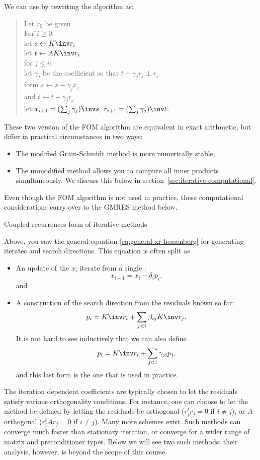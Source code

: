 We can
use  by rewriting the algorithm
as:
\begin{quote}
  \begin{tabbing}
    Let $r_0$ be given\\
    For \=$i\geq 0$:\\
    \>let $s\leftarrow K\inv r_i$\\
    \>let $t\leftarrow AK\inv r_i$\\
    \>for \=$j\leq i$:\\
    \>\>let $\gamma_j$ be the coefficient so that $t-\gamma_jr_j\perp r_j$\\
    \>\>form \=$s\leftarrow s-\gamma_jx_j$\\
    \>\>and  \>$t\leftarrow t-\gamma_jr_j$\\
    \>let $x_{i+1}=(\sum_j\gamma_j)\inv s$,
    $r_{i+1}=(\sum_j\gamma_j)\inv t$.\\
  \end{tabbing}
\end{quote}
These two version of the \ac{FOM} algorithm are 
equivalent in exact arithmetic, but differ in practical circumstances
in two ways:
\begin{itemize}
\item The modified Gram-Schmidt method is more numerically stable;
\item The unmodified method allows you to compute all inner products
  simultaneously. We discuss this below in
  section~\ref{sec:iterative-computational}.
\end{itemize}
Even though the \ac{FOM} algorithm is not used in practice, these
computational considerations carry over to the \ac{GMRES} method
below.

 {Coupled recurrences form of iterative methods}

Above, you saw the general equation \eqref{eq:general-xr-hessenberg}
for generating iterates and search directions.
This equation is often split as
\begin{itemize}
\item An update of the $x_i$ iterate from a single :
\[ x_{i+1}=x_i-\delta_i p_i, \] and
\item A construction of the search direction from the residuals known
  so far:
  \[ p_i = K\inv r_i+\sum_{j<i}\beta_{ij} K\inv r_j. \]
  It is not hard to see inductively that we can also define
  \[ p_i = K\inv r_i+\sum_{j<i}\gamma_{ji} p_j, \]
  and this last form is the one that is used in practice.
\end{itemize}
The iteration dependent coefficients are typically chosen to let the
residuals satisfy various orthogonality conditions. For instance, one
can choose to let the method be defined by letting the residuals be
orthogonal ($r_i^tr_j=0$ if $i\not=j$), or $A$-orthogonal
($r_i^tAr_j=0$ if $i\not=j$). Many more schemes exist.  Such methods
can converge much faster than stationary iteration, or converge for a
wider range of matrix and preconditioner types. Below we will see two
such methods; their analysis, however, is beyond the scope of this
course.

